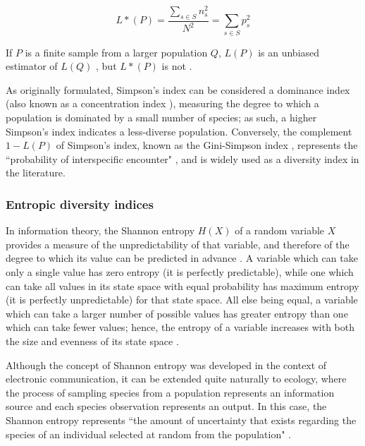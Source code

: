 \begin{equation}
L*(P) = \frac{\sum_{s \in S} n_s^2}{N^2} = \sum_{s \in S} p_s^2
\label{eq:simpson_finite}
\end{equation} 

If $P$ is a finite sample from a larger population $Q$, $L(P)$ is an unbiased estimator of $L(Q)$ , but $L*(P)$ is not \citep{simpson1949diversity}.

As originally formulated, Simpson's index can be considered a dominance index (also known as a concentration  index \citep{simpson1949diversity}), measuring the degree to which a population is dominated by a small number of species; as such, a higher Simpson's index indicates a less-diverse population. Conversely, the complement $1-L(P)$ of Simpson's index, known as the Gini-Simpson index \citep{jost2006entropy}, represents the ``probability of interspecific encounter" \citep{peet1974diversity}, and is widely used as a diversity index in the literature.

\subsubsection{Entropic diversity indices}

In information theory, the Shannon entropy $H(X)$ of a random variable $X$ provides a measure of the unpredictability of that variable, and therefore of the degree to which its value can be predicted in advance \citep{shannon1948communication1}. A variable which can take only a single value has zero entropy (it is perfectly predictable), while one which can take all values in its state space with equal probability has maximum entropy (it is perfectly unpredictable) for that state space. All else being equal, a variable which can take a larger number of possible values has greater entropy than one which can take fewer values; hence, the entropy of a variable increases with both the size and evenness of its state space \citep{shannon1948communication1}.

Although the concept of Shannon entropy was developed in the context of electronic communication, it can be extended quite naturally to ecology, where the process of sampling species from a population represents an  information source and each species observation represents an output. In this case, the Shannon entropy represents  ``the amount of uncertainty that exists regarding the species of an individual selected at random from the population" \citep{peet1974diversity}.

